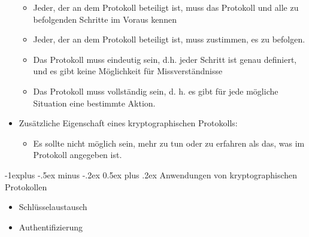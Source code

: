 \documentclass[a4paper]{article}
\makeatletter
\renewcommand{\subsection}{\@startsection{subsection}{2}{0mm}%
 {-1explus -.5ex minus -.2ex}%
 {0.5ex plus .2ex}%
 {\normalfont\normalsize\bfseries}}
\makeatother
\begin{document}
\begin{multicols}{3}
\begin{itemize}
              \begin{itemize}
                  \item
                        Jeder, der an dem Protokoll beteiligt ist, muss das Protokoll und
                        alle zu befolgenden Schritte im Voraus kennen
                  \item
                        Jeder, der an dem Protokoll beteiligt ist, muss zustimmen, es zu
                        befolgen.
                  \item
                        Das Protokoll muss eindeutig sein, d.h. jeder Schritt ist genau
                        definiert, und es gibt keine Möglichkeit für Missverständnisse
                  \item
                        Das Protokoll muss vollständig sein, d. h. es gibt für jede mögliche
                        Situation eine bestimmte Aktion.
              \end{itemize}
        \item
              Zusätzliche Eigenschaft eines kryptographischen Protokolls:

              \begin{itemize}
                  \item
                        Es sollte nicht möglich sein, mehr zu tun oder zu erfahren als das,
                        was im Protokoll angegeben ist.
              \end{itemize}
    \end{itemize}


    \subsection{Anwendungen von kryptographischen
        Protokollen}

    \begin{itemize}
        \item
              Schlüsselaustausch
        \item
              Authentifizierung


\end{itemize}
\end{multicols}
\end{document}
